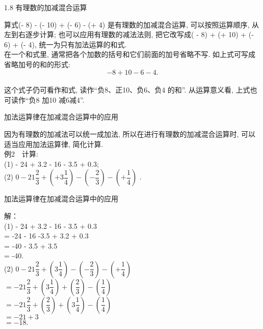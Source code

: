 \begin{frame}[t]{1.8 有理数的加减混合运算}
\begin{spacing}{1.5}
\hspace*{2em} 算式(- 8) - (- 10) + (- 6) - (+ 4) 是有理数的加减混合运算, 可以按照运算顺序, 从左到右逐步计算; 也可以应用有理数的减法法则, 把它改写成( - 8) + (+ 10) + (- 6) + (- 4), 统一为只有加法运算的和式.\\
\hspace{2em} 在一个和式里, 通常把各个加数的括号和它们前面的加号省略不写. 如上式可写成省略加号的和的形式:\\
\[- 8 + 10 - 6 - 4.\] \\
\hspace*{2em} 这个式子仍可看作和式, 读作“负8、正10、负6、负4 的和”. 从运算意义看, 上式也可读作“负8 加10 减6减4”.
\end{spacing}
\end{frame}


\begin{frame}[t]{加法运算律在加减混合运算中的应用}
\begin{spacing}{1.5}
\hspace{2em} 因为有理数的加减法可以统一成加法, 所以在进行有理数的加减混合运算时, 可以适当应用加法运算律, 简化计算.\\
例2　计算: \\
(1) - 24 + 3.2 - 16 - 3.5 + 0.3; \\
(2) $0 - 21\dfrac{2}{3} + \left(+3\dfrac{1}{4}\right) - \left(-\dfrac{2}{3} \right) - \left(+\dfrac{1}{4} \right)$ . 
\end{spacing}
\end{frame}

\begin{frame}[t]{加法运算律在加减混合运算中的应用}
\begin{spacing}{1.4}
解：\\
(1) - 24 + 3.2 - 16 - 3.5 + 0.3 \\
= -24 - 16 -3.5 + 3.2 + 0.3 \\
= -40 - 3.5 + 3.5 \\
= -40. \\
(2) $0 - 21\dfrac{2}{3} + \left(3\dfrac{1}{4}\right) - \left(-\dfrac{2}{3} \right) - \left(+\dfrac{1}{4} \right)$  \\
$= - 21\dfrac{2}{3} + \left(3\dfrac{1}{4}\right) + \left(\dfrac{2}{3} \right) - \left(\dfrac{1}{4} \right)$ \\
$= - 21\dfrac{2}{3} + \left(\dfrac{2}{3} \right) + \left(3\dfrac{1}{4}\right) - \left(\dfrac{1}{4} \right)$ \\
$= -21 + 3 $\\
$= -18.$
\end{spacing}
\end{frame}